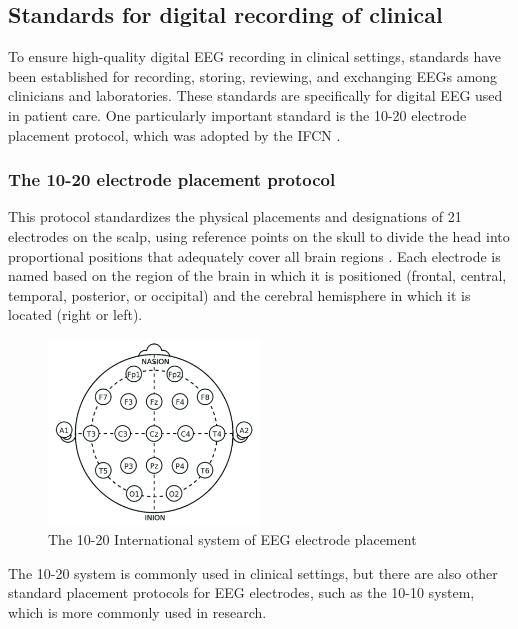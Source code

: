 \subsection{Standards for digital recording of clinical }
To ensure high-quality digital \gls{EEG} recording in clinical settings, standards have been established for recording, storing, reviewing, and exchanging \glspl{EEG} among clinicians and laboratories. These standards are specifically for digital EEG used in patient care. One particularly important standard is the 10-20 electrode placement protocol, which was adopted by the \gls{IFCN} \cite{nuwer_ifcn_1998}.

\subsubsection{The 10-20 electrode placement protocol}
This protocol standardizes the physical placements and designations of 21 electrodes on the scalp, using reference points on the skull to divide the head into proportional positions that adequately cover all brain regions \cite{rojas_study_2018}. Each electrode is named based on the region of the brain in which it is positioned (frontal, central, temporal, posterior, or occipital) and the cerebral hemisphere in which it is located (right or left).

\begin{figure}[ht]
    \centering
    \includegraphics[width=0.5\textwidth]{images/State-of-art/10-20-electrode-placement.png}
    \caption{The 10-20 International system of EEG electrode placement \cite{rojas_study_2018}}
    \label{fig:10-20-electrode-placement}
\end{figure}

The 10-20 system is commonly used in clinical settings, but there are also other standard placement protocols for EEG electrodes, such as the 10-10 system, which is more commonly used in research.

